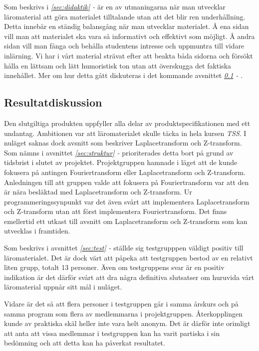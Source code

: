 \documentclass[12pt,a4paper,twoside,openright]{article}
\begin{document}
Som beskrivs i \textit{\ref{sec:didaktik} - } är
en av utmaningarna när man utvecklar läromaterial att göra materialet
tilltalande utan att det blir ren underhållning. Detta innebär en
ständig balansgång när man utvecklar materialet. Å ena sidan vill man
att materialet ska vara så informativt och effektivt som möjligt. Å
andra sidan vill man fånga och behålla studentens intresse och
uppmuntra till vidare inlärning. Vi har i vårt material strävat efter
att beakta båda sidorna och försökt hålla en lättsam och lätt
humoristisk ton utan att överskugga det faktiska innehållet. Mer om
hur detta gått diskuteras i det kommande avsnittet
\textit{\ref{sec:resDisk} - }.

\subsection{Resultatdiskussion}
\label{sec:resDisk}
Den slutgiltiga produkten uppfyller alla delar av
produktspecifikationen med ett undantag. Ambitionen var att
läromaterialet skulle täcka in hela kursen \textit{TSS}. I nuläget
saknas dock avsnitt som beskriver Laplacetransform och
Z-transform. Som nämns i avsnittet \textit{\ref{sec:struktur} - } prioriterades detta bort på grund av tidsbrist i slutet av
projektet. Projektgruppen hamnade i läget att de kunde fokusera på
antingen Fouriertransform eller Laplacetransform och
Z-transform. Anledningen till att gruppen valde att fokusera på
Fouriertransform var att den är nära besläktad med Laplacetransform
och Z-transform. Ur programmeringssynpunkt var det även svårt att
implementera Laplacetransform och Z-transform utan att först
implementera Fouriertransform. Det finns emellertid ett utkast till
avsnitt om Laplacetransform och Z-transform som kan utvecklas i
framtiden.

Som beskrivs i avsnittet \textit{\ref{sec:test} - }
ställde sig testgrupppen väldigt positiv till läromaterialet. Det är
dock värt att påpeka att testgruppen bestod av en relativt liten
grupp, totalt 13 personer.  Även om testgruppens svar är en positiv
indikation är det därför svårt att dra några definitiva slutsatser om
huruvida vårt läromaterial uppnår sitt mål i nuläget.

Vidare är det så att flera personer i testgruppen går i samma årskurs
och på samma program som flera av medlemmarna i
projektgruppen. Återkopplingen kunde av praktiska skäl heller inte
vara helt anonym. Det är därför inte orimligt att anta att vissa
medlemmar i testgruppen kan ha varit partiska i sin bedömning och att
detta kan ha påverkat resultatet.
\end{document}
